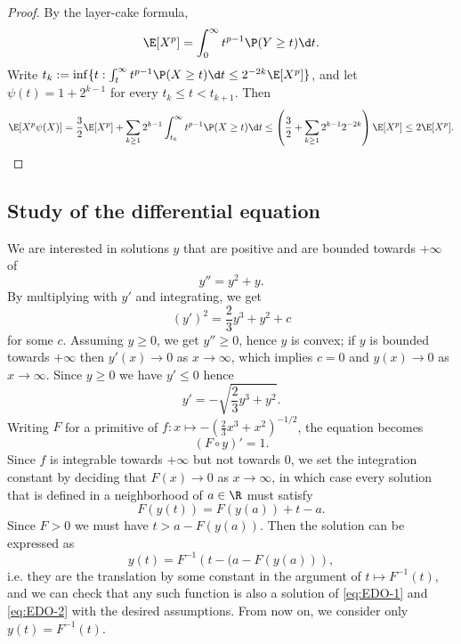 \documentclass[10pt,a4paper]{article}
\begin{document}
\begin{proof}
By the layer-cake formula, 
\[ \E[X^p] = \int_0^\infty t^{p-1} \P(Y\geq t) \d t . \]
Write $t_k := \inf \{t : \int_t^\infty t^{p-1} \P(X\geq t) \d t \leq 2^{-2k} \E[X^p] \}$, and let $\psi(t) = 1 + 2^{k-1}$ for every $t_k \leq t < t_{k+1}$. Then
\[ \E[X^p \psi(X)] = \frac{3}{2}\E[X^p] + \sum_{k\geq 1} 2^{k-1} \int_{t_k}^\infty t^{p-1} \P(X\geq t) \d t \leq \left( \frac{3}{2} + \sum_{k\geq 1} 2^{k-1} 2^{-2k}\right) \E[X^p] \leq 2 \E[X^p] . \]
\end{proof}




\subsection{Study of the differential equation}  %
\label{sec:appendix-EDO}

We are interested in solutions $y$ that are positive and are bounded towards $+\infty$ of
\begin{equation}\label{eq:EDO-1}
y'' = y^2 + y . 
\end{equation}
By multiplying with $y'$ and integrating, we get 
\begin{equation*}
(y')^2 = \frac{2}{3}y^3 + y^2 + c
\end{equation*}
for some $c$. Assuming $y\geq 0$, we get $y''\geq 0$, hence $y$ is convex; if $y$ is bounded towards $+\infty$ then $y'(x)\to 0$ as $x\to\infty$, which implies $c=0$ and $y(x)\to 0$ as $x\to\infty$. Since $y\geq 0$ we have $y'\leq 0$ hence 
\begin{equation}\label{eq:EDO-2}
y' = - \sqrt{\frac{2}{3}y^3 + y^2} .
\end{equation}
Writing $F$ for a primitive of $f : x \mapsto -(\frac 2 3 x^3+x^2)^{-1/2}$, the equation becomes
\[ (F\circ y)' = 1 . \]
Since $f$ is integrable towards $+\infty$ but not towards $0$, we set the integration constant by deciding that $F(x)\to 0$ as $x\to\infty$, in which case every solution that is defined in a neighborhood of $a\in\R$ %
must satisfy %
\begin{equation}\label{eq:EDO-sol}
F(y(t)) = F(y(a)) + t-a . 
\end{equation}
Since $F>0$ we must have $t > a-F(y(a))$. Then the solution can be expressed as
\[ y(t) = F^{-1}\left( t - (a-F(y(a)) \right) , \]
i.e. they are the translation by some constant in the argument of $t \mapsto F^{-1}(t)$, and we can check that any such function is also a solution of \eqref{eq:EDO-1} and \eqref{eq:EDO-2} with the desired assumptions. From now on, we consider only $y(t) = F^{-1}(t)$.
\end{document}
